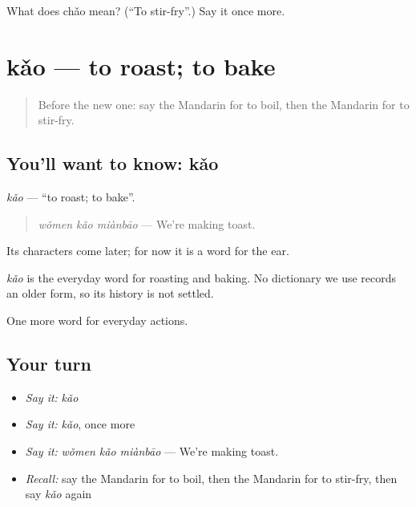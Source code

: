 \begin{tcolorbox}[breakable,colback=teal!4,colframe=teal!35!black,title={Before you move on}]
What does chǎo mean? (\textquotedblleft{}To stir-fry\textquotedblright{}.) Say it once more.
\end{tcolorbox}
\section[kǎo]{kǎo — to roast; to bake}

\label{lesson:ZH-C113-kao}



\begin{quote}
Before the new one: say the Mandarin for to boil, then the Mandarin for to stir-fry.
\end{quote}

\subsection*{You'll want to know: kǎo}
\emph{kǎo} — \textquotedblleft{}to roast; to bake\textquotedblright{}.

\begin{quote}
\emph{wǒmen kǎo miànbāo} — We're making toast.
\end{quote}

Its characters come later; for now it is a word for the ear.

\begin{cousinweb}
\emph{kǎo} is the everyday word for roasting and baking. No dictionary we use records an older form, so its history is not settled.
\end{cousinweb}

\begin{grammarlens}[title={What you've built}]
One more word for everyday actions.
\end{grammarlens}

\subsection*{Your turn}
\begin{itemize}
\raggedright
  \item \emph{Say it:} \emph{kǎo}
  \item \emph{Say it:} \emph{kǎo}, once more
  \item \emph{Say it:} \emph{wǒmen kǎo miànbāo} — We're making toast.
  \item \emph{Recall:} say the Mandarin for to boil, then the Mandarin for to stir-fry, then say \emph{kǎo} again
\end{itemize}

